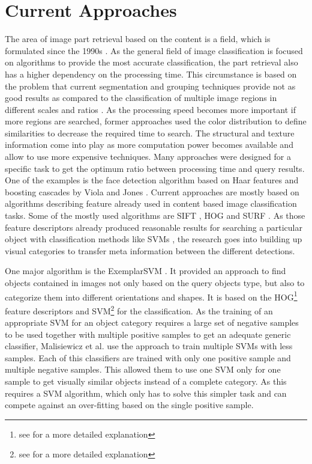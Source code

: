 \chapter{Current Approaches}

The area of image part retrieval based on the content is a field, which is formulated since the 1990s \cite{eakins1999content} \cite{rui1997content} \cite{osuna1997training}. As the general field of image classification is focused on algorithms to provide the most accurate classification, the part retrieval also has a higher dependency on the processing time. This circumstance is based on the problem that current segmentation and grouping techniques provide not as good results as compared to the classification of multiple image regions in different scales and ratios \cite{book:848523}. As the processing speed becomes more important if more regions are searched, former approaches used the color distribution to define similarities to decrease the required time to search. The structural and texture information come into play as more computation power becomes available and allow to use more expensive techniques. Many approaches were designed for a specific task to get the optimum ratio between processing time and query results. One of the examples is the face detection algorithm based on Haar features and boosting cascades by Viola and Jones \cite{viola2001rapid}. Current approaches are mostly based on algorithms describing feature already used in content based image classification tasks. Some of the mostly used algorithms are \acf{SIFT} \cite{Lowe2004}, \acf{HOG} \cite{Dalal2005} and \acf{SURF} \cite{bay2008speeded}. As those feature descriptors already produced reasonable results for searching a particular object with classification methods like \aclp{SVM} \cite{cortes1995support}, the research goes into building up visual categories to transfer meta information between the different detections.

One major algorithm is the ExemplarSVM \cite{Malisiewicz2011}. It provided an approach to find objects contained in images not only based on the query objects type, but also to categorize them into different orientations and shapes.
It is based on the \ac{HOG}\footnote{see  for a more detailed explanation} feature descriptors and \ac{SVM}\footnote{see  for a more detailed explanation} for the classification. As the training of an appropriate \ac{SVM} for an object category requires a large set of negative samples to be used together with multiple positive samples to get an adequate generic classifier, Malisiewicz et al. use the approach to train multiple \acp{SVM} with less samples. Each of this classifiers are trained with only one positive sample and multiple negative samples. This allowed them to use one \ac{SVM} only for one sample to get visually similar objects instead of a complete category. As this requires a \ac{SVM} algorithm, which only has to solve this simpler task and can compete against an over-fitting based on the single positive sample.

